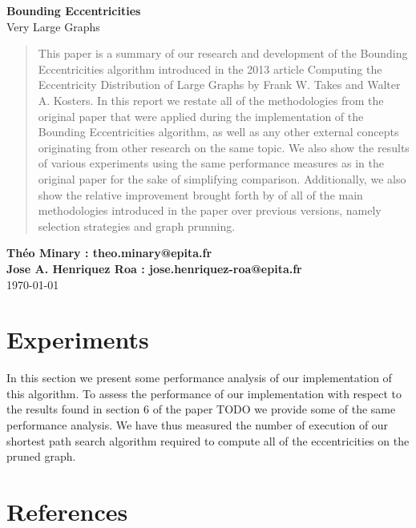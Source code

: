 \documentclass[11pt]{article}
\begin{document}
\begin{titlepage}
  \begin{center}
    \vspace*{1cm} \Huge \textbf{Bounding Eccentricities}\\
    \vspace*{1\baselineskip} Very Large Graphs\\
    \vspace*{2\baselineskip} \large
    \begin{abstract}
    This paper is a summary of our research and development
    of the Bounding Eccentricities algorithm introduced in the 2013 article
    Computing the Eccentricity Distribution of Large Graphs by Frank W. Takes
    and Walter A. Kosters. In this report we restate all of the methodologies
    from the original paper that were applied during the implementation of the
    Bounding Eccentricities algorithm, as well as any other external concepts
    originating from other research on the same topic. We also show the results
    of various experiments using the same performance measures as in the
    original paper for the sake of simplifying comparison. Additionally, we also
    show the relative improvement brought forth by of all of the main
    methodologies introduced in the paper over previous versions, namely
    selection strategies and graph prunning.
    \end{abstract}
    \vfill \normalsize \textbf{Théo Minary : theo.minary@epita.fr}\\ \textbf{Jose
      A. Henriquez Roa : jose.henriquez-roa@epita.fr}\\
    \vspace*{2\baselineskip} \today \rhead{\today}
    \newpage
    \normalsize \tableofcontents
    \newpage
  \end{center}
\end{titlepage}
\section{Experiments}
In this section we present some performance analysis of our implementation of
this algorithm. To assess the performance of our implementation with respect to
the results found in section 6 of the paper TODO we provide some of the same
performance analysis. We have thus measured the number of execution of our
shortest path search algorithm required to compute all of the eccentricities on
the pruned graph.
\section{References}
\end{document}
